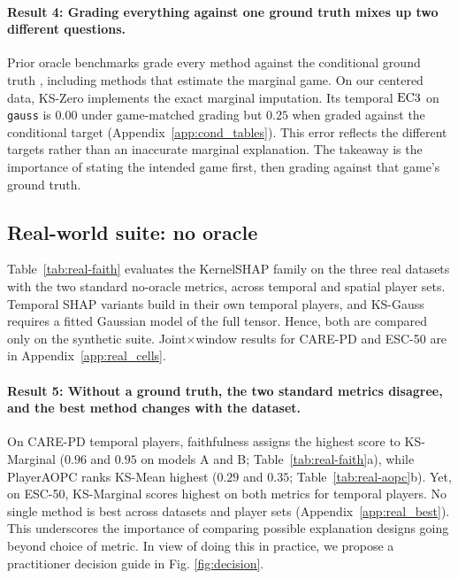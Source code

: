 \paragraph{Result 4: Grading everything against one ground truth mixes up two different questions.} Prior oracle benchmarks grade every method against the conditional ground truth \citep{aas2021explaining,olsen2022using}, including methods that estimate the marginal game. On our centered data, KS-Zero implements the exact marginal imputation. Its temporal $\mathrm{EC3}$ on \texttt{gauss} is $0.00$ under game-matched grading but $0.25$ when graded against the conditional target (Appendix~\ref{app:cond_tables}). This error reflects the different targets rather than an inaccurate marginal explanation. The takeaway is the importance of stating the intended game first, then grading against that game's ground truth.

\subsection{Real-world suite: no oracle}
\label{sec:results-real}

Table~\ref{tab:real-faith} evaluates the KernelSHAP family on the three real datasets with the two standard no-oracle metrics, across temporal and spatial player sets. Temporal SHAP variants build in their own temporal players, and KS-Gauss requires a fitted Gaussian model of the full tensor. Hence, both are compared only on the synthetic suite. Joint$\times$window results for CARE-PD and ESC-50 are in Appendix~\ref{app:real_cells}.



\paragraph{Result 5: Without a ground truth, the two standard metrics disagree, and the best method changes with the dataset.}
On CARE-PD temporal players, faithfulness assigns the highest score to KS-Marginal ($0.96$ and $0.95$ on models A and B; Table~\ref{tab:real-faith}a), while PlayerAOPC ranks KS-Mean highest ($0.29$ and $0.35$; Table~\ref{tab:real-aopc}b). Yet, on ESC-50, KS-Marginal scores highest on both metrics for temporal players. No single method is best across datasets and player sets (Appendix~\ref{app:real_best}). This underscores the importance of comparing possible explanation designs going beyond choice of metric. In view of doing this in practice, we propose a practitioner decision guide in Fig. \ref{fig:decision}. %

